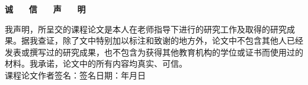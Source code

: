 ﻿\begin{center}
  \textbf{\kaishu 诚 ~~ 信 ~~ 声 ~~ 明}
\end{center}\par
\vspace{10mm}
\kaishu
我声明，所呈交的课程论文是本人在老师指导下进行的研究工作及取得的研究成果。据我查证，除了文中特别加以标注和致谢的地方外，论文中不包含其他人已经发表或撰写过的研究成果，也不包含为获得其他教育机构的学位或证书而使用过的材料。我承诺，论文中的所有内容均真实、可信。\\[45mm]
课程论文作者签名：\hspace{30mm}签名日期：\qquad 年\quad 月\quad 日
\newpage
